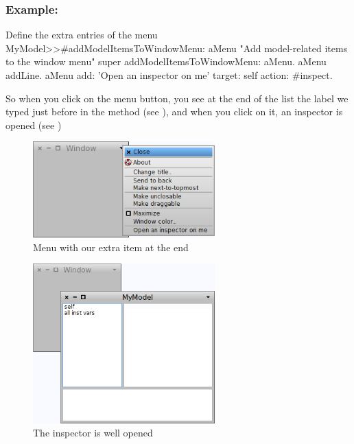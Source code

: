 \documentclass[a4paper,10pt,twoside]{book}
\begin{document}
\subsubsection{Example:}

\begin{method}{Define the extra entries of the menu}
MyModel>>#addModelItemsToWindowMenu: aMenu
	"Add model-related items to the window menu"
	super addModelItemsToWindowMenu: aMenu.
	aMenu addLine.
	aMenu
		add: 'Open an inspector on me'
		target: self
		action: #inspect.
\end{method}

So when you click on the menu button, you see at the end of the list the label we typed just before in the method   (see ), and when you click on it, an inspector is opened (see )

\begin{figure}[ht]
\begin{center}
	\includegraphics[width=7cm]{MenuBar}
	\caption{Menu with our extra item at the end}
\end{center}
\end{figure}

\begin{figure}[ht]
\begin{center}
	\includegraphics[width=7cm]{WindowAndInspector}
	\caption{The inspector is well opened}
\end{center}
\end{figure}
\end{document}
